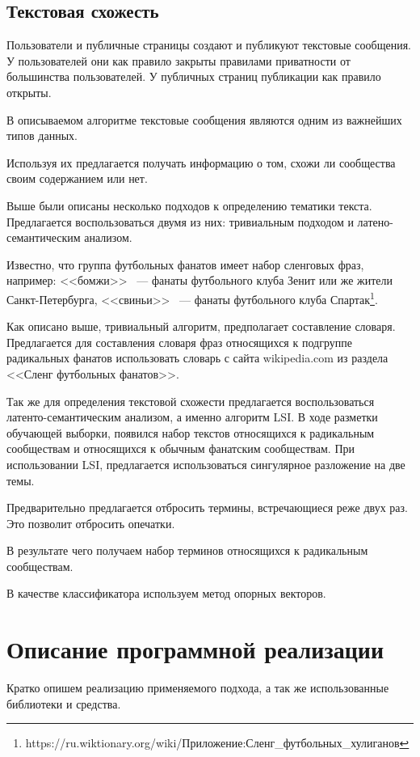 \documentclass[annotation,times,page4]{itmo-student-thesis}
\begin{document}
\subsection{Текстовая схожесть}
Пользователи и публичные страницы создают и публикуют текстовые сообщения. У пользователей они как правило закрыты правилами приватности от большинства пользователей. У публичных страниц публикации как правило открыты. 

В описываемом алгоритме текстовые сообщения являются одним из важнейших типов данных. 

Используя их предлагается получать информацию о том, схожи ли сообщества своим содержанием или нет.

Выше были описаны несколько подходов к определению тематики текста. Предлагается воспользоваться двумя из них: тривиальным подходом и латено-семантическим анализом. 

Известно, что группа футбольных фанатов имеет набор сленговых фраз, например: <<бомжи>> ~--- фанаты футбольного клуба Зенит или же жители Санкт-Петербурга, <<свиньи>> ~--- фанаты футбольного клуба Спартак\footnote{https://ru.wiktionary.org/wiki/Приложение:Сленг\_футбольных\_хулиганов}.

Как описано выше, тривиальный алгоритм, предполагает составление словаря. Предлагается для составления словаря фраз относящихся к подгруппе радикальных фанатов использовать словарь с сайта wikipedia.com из раздела <<Сленг футбольных фанатов>>.

Так же для определения текстовой схожести предлагается воспользоваться латенто-семантическим анализом, а именно алгоритм LSI. В ходе разметки обучающей выборки, появился набор текстов относящихся к радикальным сообществам и относящихся к обычным фанатским сообществам. При использовании LSI, предлагается использоваться сингулярное разложение на две темы.

Предварительно предлагается отбросить термины, встречающиеся реже двух раз. Это позволит отбросить опечатки. 

В результате чего получаем набор терминов относящихся к радикальным сообществам.   

В качестве классификатора используем метод опорных векторов. 
\section{Описание программной реализации}
Кратко опишем реализацию применяемого подхода, а так же использованные библиотеки и средства.
\end{document}
